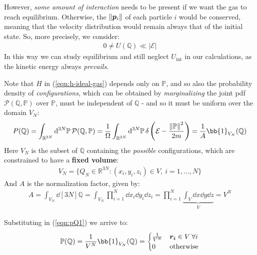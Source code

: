 \documentclass[../template.tex]{subfiles}
\begin{document}
\medskip

However, \textit{some amount of interaction} needs to be present if we want the gas to reach equilibrium. Otherwise,  the $\norm{\bm{p}_i}$ of each particle $i$ would be conserved, meaning that the velocity distribution would remain always that of the initial state. So, more precisely, we consider:
\begin{align*}
    0 \neq U(\mathbb{Q}) \ll |\mathcal{E}|
\end{align*}  
In this way we can study equilibrium and still neglect $U_{\mathrm{int}}$ in our calculations, as the kinetic energy always \textit{prevails}. 

\medskip

Note that $H$ in (\ref{eqn:h-ideal-gas}) depends only on $\mathbb{P}$, and so also the probability density of \textit{configurations}, which can be obtained by \textit{marginalizing} the joint pdf $\mathcal{P}(\mathbb{Q},\mathbb{P})$ over $\mathbb{P}$, must be independent of $\mathbb{Q}$ - and so it must be uniform over the  domain $V_N$:
\begin{align}\label{eqn:pQ1}
    P(\mathbb{Q}) = \int_{\mathbb{R}^{3N}} \dd[3N]{\mathbb{P}} \mathcal{P}(\mathbb{Q},\mathbb{P}) = \frac{1}{\Omega} \int_{\mathbb{R}^{3N}} \dd[3N]{\mathbb{P}} \delta\left(\mathcal{E}- \frac{\norm{\mathbb{P}}^2}{2m} \right) = \frac{1}{A} \bb{1}_{V_N}(\mathbb{Q})
\end{align}
Here $V_N$ is the subset of $\mathbb{Q}$ containing the \textit{possible} configurations, which are constrained to have a \textbf{fixed volume}:
\begin{align*}
    V_N = \{Q_N \in \mathbb{R}^{3N} \colon (x_i, y_i, z_i) \in V, \> i = 1, \dots, N\}
\end{align*} 
And $A$ is the normalization factor, given by:
\begin{align}
    A = \int_{V_N} \dd[3N]{\mathbb{Q}} = \int_{V_N} \prod_{i=1}^{N} \dd{x_i}\dd{y_i}\dd{z_i} = \prod_{i=1}^N \underbrace{\int_V \dd{x}\dd{y}\dd{z}}_{V}  = V^N
\end{align}

Substituting in (\ref{eqn:pQ1}) we arrive to:
\begin{align} \label{eqn:pQ2}
    \mathbb{P}(\mathbb{Q}) = \frac{1}{V^N} \bb{1}_{V_N}(\mathbb{Q}) = \begin{cases}
        \frac{1}{V^N} & \bm{r_i} \in V \> \forall i\\
        0 & \text{otherwise} 
    \end{cases} 
\end{align}
\end{document}
